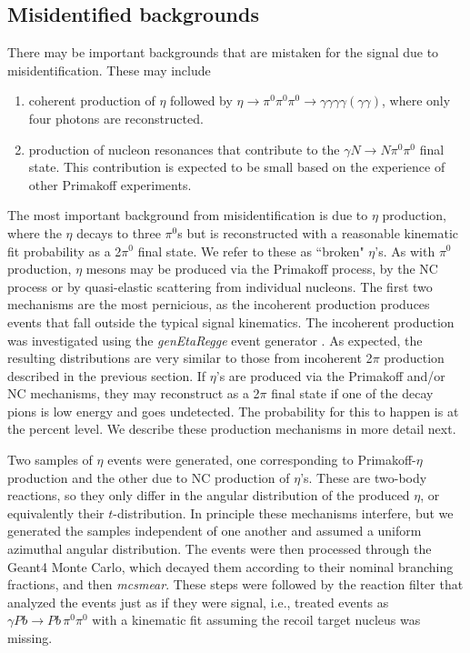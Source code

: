 \subsection{Misidentified backgrounds}

There may be important backgrounds that are mistaken for the signal
due to misidentification. These may include

\begin{enumerate}[label=(\roman*)]
    \item coherent production of $\eta$ followed by $\eta\rightarrow
      \pi^0\pi^0\pi^0 \rightarrow
      \gamma\gamma\gamma\gamma(\gamma\gamma)$, where only four photons
      are reconstructed.
    \item production of nucleon resonances that contribute to the
      $\gamma N \rightarrow N \pi^0\pi^0$ final state. This
      contribution is expected to be small based on the experience of
      other Primakoff experiments.
\end{enumerate}
The most important background from misidentification is due to
$\eta$ production, where the $\eta$ decays to three $\pi^0$s but is
reconstructed with a reasonable kinematic fit probability as a 2$\pi^0$ final
state. We refer to these as ``broken" $\eta$'s. As with $\pi^0$
production, $\eta$ mesons may be produced via the Primakoff process,
by the NC process or by quasi-elastic scattering from individual
nucleons. The first two mechanisms are the most pernicious, as the
incoherent production produces events that fall outside the typical
signal kinematics.  The incoherent production was investigated using
the {\em genEtaRegge} event generator \cite{hdnote2437}. As expected,
the resulting distributions are very similar to those from incoherent
2$\pi$ production described in the previous section.  If $\eta$'s are
produced via the Primakoff and/or NC mechanisms, they may reconstruct
as a 2$\pi$ final state if one of the decay pions is low energy and
goes undetected. The probability for this to happen is at the percent
level.  We describe these production mechanisms in more detail next.

Two samples of $\eta$ events were generated, one corresponding to
Primakoff-$\eta$ production and the other due to NC production of
$\eta$'s. These are two-body reactions, so they only differ in the
angular distribution of the produced $\eta$, or equivalently their
$t$-distribution. In principle these mechanisms interfere, but we
generated the samples independent of one another and assumed a
uniform azimuthal angular distribution. The events were then processed
through the Geant4 Monte Carlo, which decayed them according to their
nominal branching fractions, and then {\em mcsmear}. These steps were
followed by the reaction filter that analyzed the events just as if
they were signal, i.e., treated events as $\gamma Pb \rightarrow Pb\,
\pi^0 \pi^0$ with a kinematic fit assuming the recoil target nucleus
was missing.

